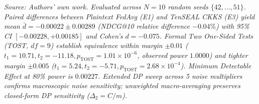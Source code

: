 \begin{table}[H]
\par\smallskip\raggedright\textit{Source: Authors' own work. Evaluated across $N=10$ random seeds $\{42, \dots, 51\}$. Paired differences between Plaintext FedAvg (E1) and TenSEAL CKKS (E3) yield mean $\bar{d} = -0.00022 \pm 0.00289$ (NDCG@10 relative difference $-0.04\%$) with 95\% CI $[-0.00228, +0.00185]$ and Cohen's $d = -0.075$. Formal Two One-Sided Tests (TOST, $df=9$) establish equivalence within margin $\pm 0.01$ ($t_1=10.71, t_2=-11.18, p_{\mathrm{TOST}}=1.01\times 10^{-6}$, observed power $1.0000$) and tighter margin $\pm 0.005$ ($t_1=5.24, t_2=-5.71, p_{\mathrm{TOST}}=2.68\times 10^{-4}$). Minimum Detectable Effect at 80\% power is $0.00227$. Extended DP sweep across 5 noise multipliers confirms macroscopic noise sensitivity; unweighted macro-averaging preserves closed-form DP sensitivity ($\Delta_2 = C/m$).}
\end{table}

\clearpage

